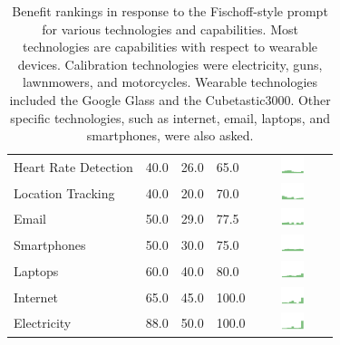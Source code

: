 \begin{table}[h!!!!!]
\begin{center}
\begin{tabular}{| p{2cm} | p{1cm} | p{1cm} | p{1cm} | c |}
Heart Rate Detection & 40.0 & 26.0 & 65.0 & \includegraphics[width = 2cm, height = 0.5cm]{tex-inputs/table-images/heartratedetectionben} \\ 
Location Tracking & 40.0 & 20.0 & 70.0 & \includegraphics[width = 2cm, height = 0.5cm]{tex-inputs/table-images/locationtrackingben} \\ 
Email & 50.0 & 29.0 & 77.5 & \includegraphics[width = 2cm, height = 0.5cm]{tex-inputs/table-images/emailben} \\ 
Smartphones & 50.0 & 30.0 & 75.0 & \includegraphics[width = 2cm, height = 0.5cm]{tex-inputs/table-images/smartphonesben} \\ 
Laptops & 60.0 & 40.0 & 80.0 & \includegraphics[width = 2cm, height = 0.5cm]{tex-inputs/table-images/laptopsben} \\ 
Internet & 65.0 & 45.0 & 100.0 & \includegraphics[width = 2cm, height = 0.5cm]{tex-inputs/table-images/internetben} \\ 
Electricity & 88.0 & 50.0 & 100.0 & \includegraphics[width = 2cm, height = 0.5cm]{tex-inputs/table-images/ElectricityBenefit} \\ 
\hline
\end{tabular}
\caption{Benefit rankings in response to the Fischoff-style prompt for various technologies and capabilities. Most technologies are capabilities with respect to wearable devices. Calibration technologies were electricity, guns, lawnmowers, and motorcycles. Wearable technologies included the Google Glass and the Cubetastic3000. Other specific technologies, such as internet, email, laptops, and smartphones, were also asked. }
\label{benefit}
\end{center}
\end{table}